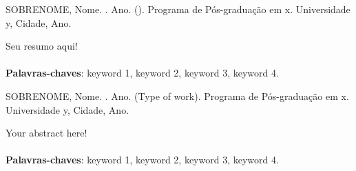 \documentclass[
	12pt,				%
	openright,			%
	oneside,			%
	a4paper,			%
	chapter=TITLE,		%
	section=TITLE,		%
	english,			%
	brazil				%
	]{abntex2}
\begin{document}
\noindent
SOBRENOME, Nome. \imprimirtitulo . Ano. (\imprimirtipotrabalho). Programa de Pós-graduação em x. Universidade y, Cidade, Ano.
\vspace*{1cm}
\begin{resumo}
\vspace*{1cm}
Seu resumo aqui!
 \\
 \\
 \noindent
 \textbf{Palavras-chaves}: keyword 1, keyword 2, keyword 3, keyword 4.
\end{resumo}

\noindent
SOBRENOME, Nome. \imprimirtitulo . Ano. (Type of work). Programa de Pós-graduação em x. Universidade y, Cidade, Ano.
\vspace*{1cm}
\begin{resumo}
\vspace*{1cm}
Your abstract here!
 \\
 \\
 \noindent
 \textbf{Palavras-chaves}: keyword 1, keyword 2, keyword 3, keyword 4.
\end{resumo}

\tableofcontents*
\cleardoublepage


\textual  %

\pagestyle{simple}


\postextual

%
\end{document}

